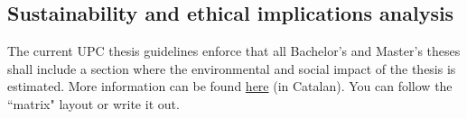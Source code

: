 \begin{landscape}
\chapter{Sustainability and ethical implications analysis}

The current UPC thesis guidelines enforce that all Bachelor's and Master's theses shall include a section where the environmental and social impact of the thesis is estimated. More information can be found \href{https://govern.upc.edu/ca/consell-de-govern/consell-de-govern/sessio-07-2023-del-consell-de-govern/comissio-docencia-i-politica-academica-pendent-celebracio/informacio-de-la-guia-per-incorporar-lanalisi-de-sostenibilitat-i-implicacions-etiques-en-els-tfe/informacio-de-la-guia-per-incorporar-lanalisi-de-sostenibilitat-i-implicacions-etiques-en-els-tfe/@@display-file/visiblefile/Guia%20Informe%20Sostenibilitat%20TFG_TFM_versi%C3%B3%20UPC.pdf}{here} (in Catalan). You can follow the ``matrix" layout or write it out.

\hspace*{\fill}\vspace*{\fill}


\end{landscape}
